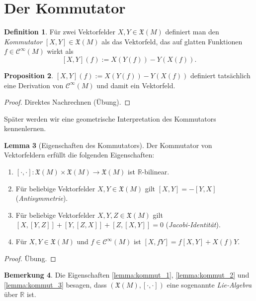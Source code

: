\documentclass[a4paper]{scrbook}
\numberwithin{equation}{chapter}
\newcommand{\R}{\mathbb{R}}
\newcommand{\sC}{\mathcal{C}^{\infty}}
\theoremstyle{definition}
\newtheorem{defn}{Definition}[section]
\newtheorem{lemma}[defn]{Lemma}
\newtheorem{prop}[defn]{Proposition}
\newtheorem{bem}[defn]{Bemerkung}
\newcommand{\bewUeb}{\begin{proof}Übung.\end{proof}}
\begin{document}
\section{Der Kommutator}

\begin{defn}
	Für zwei Vektorfelder $X, Y \in \mathfrak X(M)$ definiert man den \emph{Kommutator} $[X,Y] \in \mathfrak X(M)$ als das Vektorfeld, das auf glatten Funktionen $f\in \sC(M)$ wirkt als
	\[[X,Y](f) := X(Y(f)) - Y(X(f)).\]
\end{defn}

\begin{prop}
	$[X,Y](f) := X(Y(f)) - Y(X(f))$ definiert tatsächlich eine Derivation von $\sC(M)$ und damit ein Vektorfeld.

	\begin{proof}
		Direktes Nachrechnen (Übung).
	\end{proof}
\end{prop}

Später werden wir eine geometrische Interpretation des Kommutators kennenlernen.

\begin{lemma}[Eigenschaften des Kommutators] \label{lemma:kommut}
	Der Kommutator von Vektorfeldern erfüllt die folgenden Eigenschaften:
	\begin{enumerate}[label=(\roman*)]
		\item \label{lemma:kommut_1} $[\cdot,\cdot] \colon \mathfrak X(M) \times \mathfrak X(M) \to \mathfrak X(M)$ ist $\R$-bilinear.
		\item \label{lemma:kommut_2} Für beliebige Vektorfelder $X,Y \in \mathfrak X(M)$ gilt $[X,Y] = -[Y,X]$ (\emph{Antisymmetrie}).
		\item \label{lemma:kommut_3} Für beliebige Vektorfelder $X,Y,Z \in \mathfrak X(M)$ gilt $[X,[Y,Z]] + [Y,[Z,X]] + [Z,[X,Y]] = 0$ (\emph{Jacobi-Identität}).
		\item \label{lemma:kommut_4} Für $X,Y \in \mathfrak X(M)$ und $f \in \sC(M)$ ist $[X,fY] = f[X,Y] + X(f) Y$.
	\end{enumerate}
	\bewUeb
\end{lemma}
\begin{bem}
	Die Eigenschaften \ref{lemma:kommut_1}, \ref{lemma:kommut_2} und \ref{lemma:kommut_3} besagen, dass $(\mathfrak X(M), [\cdot,\cdot])$ eine sogenannte \emph{Lie-Algebra} über $\R$ ist.
\end{bem}
\end{document}
